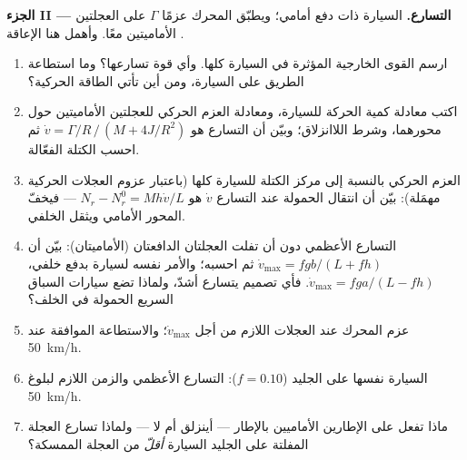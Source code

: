 \begin{problem}
\medskip
\noindent\textbf{الجزء II --- التسارع.}
السيارة ذات دفع أمامي؛ ويطبّق المحرك عزمًا $\Gamma$ على
العجلتين الأماميتين معًا. وأهمل هنا الإعاقة .
\begin{enumerate}[resume]
  \item ارسم القوى الخارجية المؤثرة في السيارة كلها. وأي قوة
        تسارعها؟ وما استطاعة الطريق على السيارة، ومن أين تأتي
        الطاقة الحركية؟
  \item اكتب معادلة كمية الحركة للسيارة، ومعادلة العزم الحركي
        للعجلتين الأماميتين حول محورهما، وشرط اللاانزلاق؛ وبيّن
        أن التسارع هو $\dot v =
        \Gamma/R\,/\,(M + 4J/R^2)$ ثم احسب الكتلة الفعّالة.
  \item العزم الحركي بالنسبة إلى مركز الكتلة للسيارة كلها
        (باعتبار عزوم العجلات الحركية مهمَلة): بيّن أن انتقال
        الحمولة عند التسارع $\dot v$ هو $N_r - N_r^0 =
        Mh\dot v/L$ --- فيخفّ المحور الأمامي ويثقل الخلفي.
  \item التسارع الأعظمي دون أن تفلت العجلتان الدافعتان
        (الأماميتان): بيّن أن $\dot v_{\max} = fgb/(L + fh)$ ثم
        احسبه؛ والأمر نفسه لسيارة بدفع خلفي، $\dot v_{\max} =
        fga/(L - fh)$. فأي تصميم يتسارع أشدّ، ولماذا تضع سيارات
        السباق السريع الحمولة في الخلف؟
  \item عزم المحرك عند العجلات اللازم من أجل $\dot v_{\max}$؛
        والاستطاعة الموافقة عند \qty{50}{km/h}.
  \item السيارة نفسها على الجليد ($f = 0.10$): التسارع الأعظمي
        والزمن اللازم لبلوغ \qty{50}{km/h}.
  \item ماذا تفعل  على الإطارين الأماميين بالإطار
        --- أينزلق أم لا --- ولماذا تسارع العجلة المفلتة على
        الجليد السيارة \emph{أقلّ} من العجلة الممسكة؟
\end{enumerate}


\end{problem}

